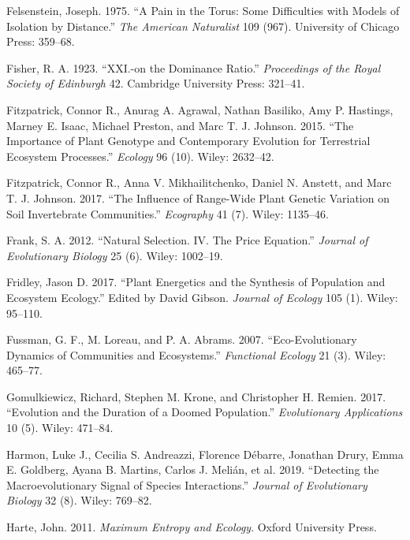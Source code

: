 \documentclass[]{article}
\begin{document}
\leavevmode\hypertarget{ref-Felsenstein1975}{}%
Felsenstein, Joseph. 1975. ``A Pain in the Torus: Some Difficulties with
Models of Isolation by Distance.'' \emph{The American Naturalist} 109
(967). University of Chicago Press: 359--68.

\leavevmode\hypertarget{ref-Fisher1923}{}%
Fisher, R. A. 1923. ``XXI.-on the Dominance Ratio.'' \emph{Proceedings
of the Royal Society of Edinburgh} 42. Cambridge University Press:
321--41.

\leavevmode\hypertarget{ref-Fitzpatrick2015}{}%
Fitzpatrick, Connor R., Anurag A. Agrawal, Nathan Basiliko, Amy P.
Hastings, Marney E. Isaac, Michael Preston, and Marc T. J. Johnson.
2015. ``The Importance of Plant Genotype and Contemporary Evolution for
Terrestrial Ecosystem Processes.'' \emph{Ecology} 96 (10). Wiley:
2632--42.

\leavevmode\hypertarget{ref-Fitzpatrick2017}{}%
Fitzpatrick, Connor R., Anna V. Mikhailitchenko, Daniel N. Anstett, and
Marc T. J. Johnson. 2017. ``The Influence of Range-Wide Plant Genetic
Variation on Soil Invertebrate Communities.'' \emph{Ecography} 41 (7).
Wiley: 1135--46.

\leavevmode\hypertarget{ref-FRANK2012}{}%
Frank, S. A. 2012. ``Natural Selection. IV. The Price Equation.''
\emph{Journal of Evolutionary Biology} 25 (6). Wiley: 1002--19.

\leavevmode\hypertarget{ref-Fridley2017}{}%
Fridley, Jason D. 2017. ``Plant Energetics and the Synthesis of
Population and Ecosystem Ecology.'' Edited by David Gibson.
\emph{Journal of Ecology} 105 (1). Wiley: 95--110.

\leavevmode\hypertarget{ref-FUSSMANN2007}{}%
Fussman, G. F., M. Loreau, and P. A. Abrams. 2007. ``Eco-Evolutionary
Dynamics of Communities and Ecosystems.'' \emph{Functional Ecology} 21
(3). Wiley: 465--77.

\leavevmode\hypertarget{ref-Gomulkiewicz2017}{}%
Gomulkiewicz, Richard, Stephen M. Krone, and Christopher H. Remien.
2017. ``Evolution and the Duration of a Doomed Population.''
\emph{Evolutionary Applications} 10 (5). Wiley: 471--84.

\leavevmode\hypertarget{ref-Harmon2019}{}%
Harmon, Luke J., Cecilia S. Andreazzi, Florence Débarre, Jonathan Drury,
Emma E. Goldberg, Ayana B. Martins, Carlos J. Melián, et al. 2019.
``Detecting the Macroevolutionary Signal of Species Interactions.''
\emph{Journal of Evolutionary Biology} 32 (8). Wiley: 769--82.

\leavevmode\hypertarget{ref-Harte2011}{}%
Harte, John. 2011. \emph{Maximum Entropy and Ecology}. Oxford University
Press.
\end{document}
